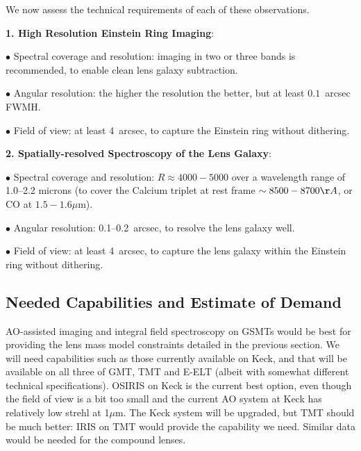 We now assess the technical  requirements of each of these observations.

{\bf 1. High Resolution Einstein Ring Imaging}:

$\bullet$ Spectral coverage and resolution: imaging in two or three bands is
recommended, to enable clean lens galaxy subtraction.

$\bullet$ Angular resolution: the higher the resolution the better, but
at least $0.1$~arcsec FWMH.

$\bullet$ Field of view: at least 4~arcsec, to capture the Einstein
ring without dithering.


{\bf 2. Spatially-resolved Spectroscopy of the Lens Galaxy}:

$\bullet$ Spectral coverage and resolution: $R\approx4000-5000$  over a
wavelength range of 1.0--2.2 microns (to cover the Calcium triplet at rest frame
$\sim8500-8700\AA$, or CO at $1.5-1.6\mu$m).

$\bullet$ Angular resolution: 0.1--0.2~arcsec, to resolve the lens galaxy well.

$\bullet$ Field of view: at least 4~arcsec, to capture the lens galaxy
within the Einstein ring without dithering.



\subsection{Needed Capabilities and Estimate of Demand}


AO-assisted imaging and integral field spectroscopy on GSMTs would be
best for providing the lens mass model constraints detailed in the
previous section.  We will need capabilities such as those currently
available on Keck, and that will be available on all three of GMT, TMT
and E-ELT (albeit with somewhat different technical specifications).
OSIRIS on Keck is the current best option, even though the field of view
is a bit too small and the current AO system at Keck has relatively low
strehl at 1$\mu$m. The Keck system will be upgraded, but TMT should be
much better: IRIS on TMT would provide the capability we need. Similar
data would be needed for the compound lenses.

